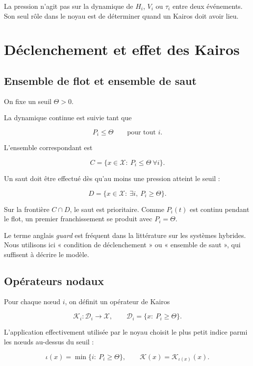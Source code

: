 La pression n'agit pas sur la dynamique de \(H_i\), \(V_i\) ou \(\tau_i\) entre deux événements. Son seul rôle dans le noyau est de déterminer quand un Kairos doit avoir lieu.

\chapter{Déclenchement et effet des Kairos}\label{t1-declenchement-et-effet-des-kairos}

\section{Ensemble de flot et ensemble de saut}\label{t1-ensemble-de-flot-et-ensemble-de-saut}

On fixe un seuil \(\Theta>0\).

La dynamique continue est suivie tant que

\[
P_i\leq\Theta
\qquad
\text{pour tout }i.
\]

L'ensemble correspondant est

\[
C
=
\{x\in\mathcal X:\ P_i\leq\Theta\ \forall i\}.
\]

Un saut doit être effectué dès qu'au moins une pression atteint le seuil
:

\[
D
=
\{x\in\mathcal X:\ \exists i,\ P_i\geq\Theta\}.
\]

Sur la frontière \(C\cap D\), le saut est prioritaire. Comme \(P_i(t)\) est continu pendant le flot, un premier franchissement se produit avec \(P_i=\Theta\).

Le terme anglais \emph{guard} est fréquent dans la littérature sur les systèmes hybrides. Nous utilisons ici « condition de déclenchement » ou « ensemble de saut », qui suffisent à décrire le modèle.

\section{Opérateurs nodaux}\label{t1-operateurs-nodaux}

Pour chaque nœud \(i\), on définit un opérateur de Kairos

\[
\mathcal{K}_i:\mathcal D_i\longrightarrow\mathcal X,
\qquad
\mathcal D_i=\{x:\ P_i\geq\Theta\}.
\]

L'application effectivement utilisée par le noyau choisit le plus petit indice parmi les nœuds au-dessus du seuil :

\[
\iota(x)
=
\min\{i:\ P_i\geq\Theta\},
\qquad
\mathcal{K}(x)
=
\mathcal{K}_{\iota(x)}(x).
\]

